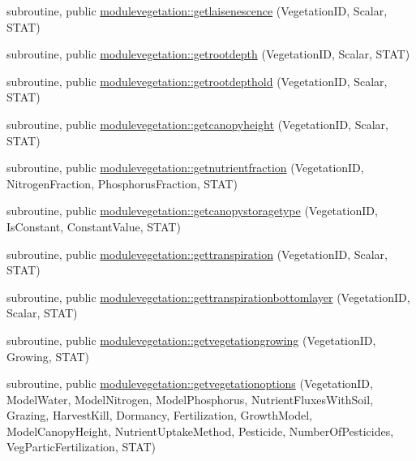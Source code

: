 \begin{DoxyCompactItemize}
subroutine, public \mbox{\hyperlink{namespacemodulevegetation_a91f1942c40129d70091dd872f5f926ae}{modulevegetation\+::getlaisenescence}} (Vegetation\+ID, Scalar, S\+T\+AT)
\item 
subroutine, public \mbox{\hyperlink{namespacemodulevegetation_a4eb34f9d9a6f4daecca56ea8f69b25b3}{modulevegetation\+::getrootdepth}} (Vegetation\+ID, Scalar, S\+T\+AT)
\item 
subroutine, public \mbox{\hyperlink{namespacemodulevegetation_a09efc99ad0002ea520622c460b1b067d}{modulevegetation\+::getrootdepthold}} (Vegetation\+ID, Scalar, S\+T\+AT)
\item 
subroutine, public \mbox{\hyperlink{namespacemodulevegetation_af38b12fb3f6aba5eaf0e0153c1a5cf5b}{modulevegetation\+::getcanopyheight}} (Vegetation\+ID, Scalar, S\+T\+AT)
\item 
subroutine, public \mbox{\hyperlink{namespacemodulevegetation_afcdcb6390a6a25bc7c5e5d70525ac36d}{modulevegetation\+::getnutrientfraction}} (Vegetation\+ID, Nitrogen\+Fraction, Phosphorus\+Fraction, S\+T\+AT)
\item 
subroutine, public \mbox{\hyperlink{namespacemodulevegetation_a518c8834ccdc068342976e2fb709d93e}{modulevegetation\+::getcanopystoragetype}} (Vegetation\+ID, Is\+Constant, Constant\+Value, S\+T\+AT)
\item 
subroutine, public \mbox{\hyperlink{namespacemodulevegetation_a016291d4e7aeb601c4e8ad878693cce7}{modulevegetation\+::gettranspiration}} (Vegetation\+ID, Scalar, S\+T\+AT)
\item 
subroutine, public \mbox{\hyperlink{namespacemodulevegetation_ad98c388458251c42c13f5d7ee73e3b9f}{modulevegetation\+::gettranspirationbottomlayer}} (Vegetation\+ID, Scalar, S\+T\+AT)
\item 
subroutine, public \mbox{\hyperlink{namespacemodulevegetation_ad0a29b6dd966a910007e5e5268c1bb4a}{modulevegetation\+::getvegetationgrowing}} (Vegetation\+ID, Growing, S\+T\+AT)
\item 
subroutine, public \mbox{\hyperlink{namespacemodulevegetation_a95ec1a8e366b1743687f4824f5ac8672}{modulevegetation\+::getvegetationoptions}} (Vegetation\+ID, Model\+Water, Model\+Nitrogen, Model\+Phosphorus, Nutrient\+Fluxes\+With\+Soil, Grazing, Harvest\+Kill, Dormancy, Fertilization, Growth\+Model, Model\+Canopy\+Height, Nutrient\+Uptake\+Method, Pesticide, Number\+Of\+Pesticides, Veg\+Partic\+Fertilization, S\+T\+AT)
\item 

\end{DoxyCompactItemize}
